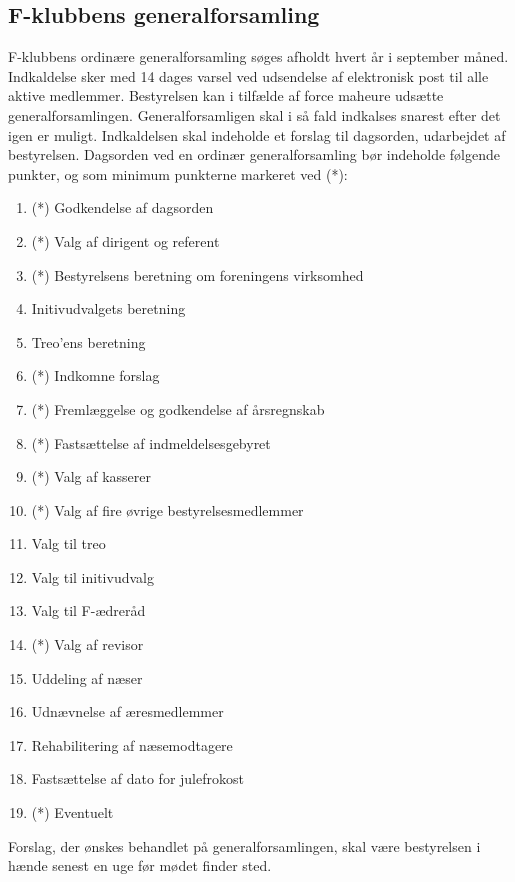 \documentclass[a4paper,12pt,danish]{article}
\begin{document}
\begin{list}
\section{F-klubbens generalforsamling}

\item \label{par-gen} F-klubbens ordinære generalforsamling
  søges afholdt hvert år i september måned. Indkaldelse sker med 14
  dages varsel ved udsendelse af elektronisk post til alle aktive
  medlemmer. Bestyrelsen kan i tilfælde af force maheure udsætte 
  generalforsamlingen. Generalforsamligen skal i så fald indkalses 
  snarest efter det igen er muligt. Indkaldelsen skal indeholde et forslag til
  dagsorden, udarbejdet af bestyrelsen. Dagsorden ved en ordinær
  generalforsamling bør indeholde følgende punkter, og som minimum
punkterne markeret ved (*):

\begin{enumerate}
\item (*) Godkendelse af dagsorden
\item (*) Valg af dirigent og referent
\item (*) Bestyrelsens beretning om foreningens virksomhed
\item Initivudvalgets beretning
\item Treo'ens beretning
\item (*) Indkomne forslag
\item (*) Fremlæggelse og godkendelse af årsregnskab
\item (*) Fastsættelse af indmeldelsesgebyret
\item (*) Valg af kasserer
\item (*) Valg af fire øvrige bestyrelsesmedlemmer
\item Valg til treo
\item Valg til initivudvalg
\item Valg til F-ædreråd
\item (*) Valg af revisor
\item Uddeling af næser
\item Udnævnelse af æresmedlemmer
\item Rehabilitering af næsemodtagere
\item Fastsættelse af dato for julefrokost
\item (*) Eventuelt
\end{enumerate}

Forslag, der ønskes behandlet på generalforsamlingen, skal
være bestyrelsen i hænde senest en uge før mødet finder
  sted.
  

\end{list}
\end{document}
